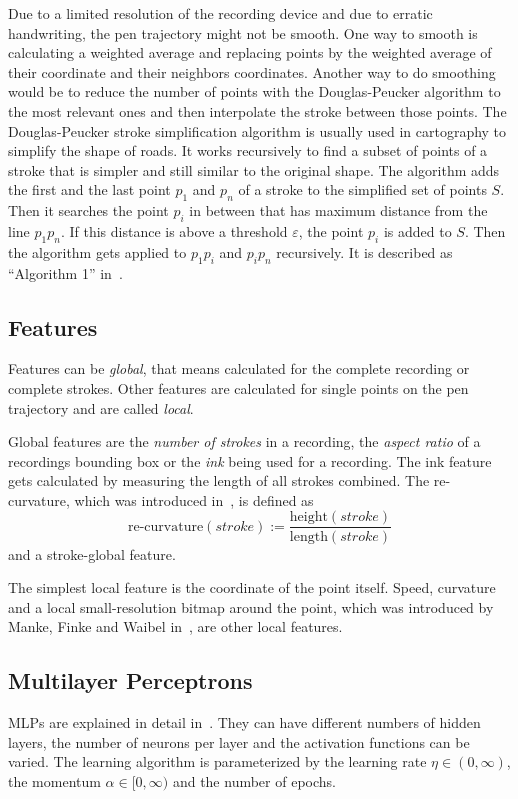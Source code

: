 \documentclass[9pt,technote]{IEEEtran}
\begin{document}
Due to a limited resolution of the recording device and due to erratic
handwriting, the pen trajectory might not be smooth. One way to smooth is
calculating a weighted average and replacing points by the weighted average of
their coordinate and their neighbors coordinates. Another way to do smoothing
would be to reduce the number of points with the Douglas-Peucker algorithm to
the most relevant ones and then interpolate the stroke between those points.
The Douglas-Peucker stroke simplification algorithm is usually used in
cartography to simplify the shape of roads. It works recursively to find a
subset of points of a stroke that is simpler and still similar to the original
shape. The algorithm adds the first and the last point $p_1$ and $p_n$ of a
stroke to the simplified set of points $S$. Then it searches the point $p_i$ in
between that has maximum distance from the line $p_1 p_n$. If this
distance is above a threshold $\varepsilon$, the point $p_i$ is added to $S$.
Then the algorithm gets applied to $p_1 p_i$ and $p_i p_n$ recursively. It is
described as \enquote{Algorithm 1} in~\cite{Visvalingam1990}.

\subsection{Features}\label{sec:features}
Features can be \textit{global}, that means calculated for the complete
recording or complete strokes. Other features are calculated for single points
on the pen trajectory and are called \textit{local}.

Global features are the \textit{number of strokes} in a recording, the
\textit{aspect ratio} of a recordings bounding box or the
\textit{ink} being used for a recording. The ink feature gets calculated by
measuring the length of all strokes combined. The re-curvature, which was
introduced in~\cite{Huang06}, is defined as
\[\text{re-curvature}(stroke) := \frac{\text{height}(stroke)}{\text{length}(stroke)}\]
and a stroke-global feature.

The simplest local feature is the coordinate of the point itself. Speed,
curvature and a local small-resolution bitmap around the point, which was
introduced by Manke, Finke and Waibel in~\cite{Manke1995}, are other local
features.

\subsection{Multilayer Perceptrons}\label{sec:mlp-training}
\Glspl{MLP} are explained in detail in~\cite{Mitchell97}. They can have
different numbers of hidden layers, the number of neurons per layer and the
activation functions can be varied. The learning algorithm is parameterized by
the learning rate $\eta \in (0, \infty)$, the momentum $\alpha \in [0, \infty)$
and the number of epochs.
\end{document}
